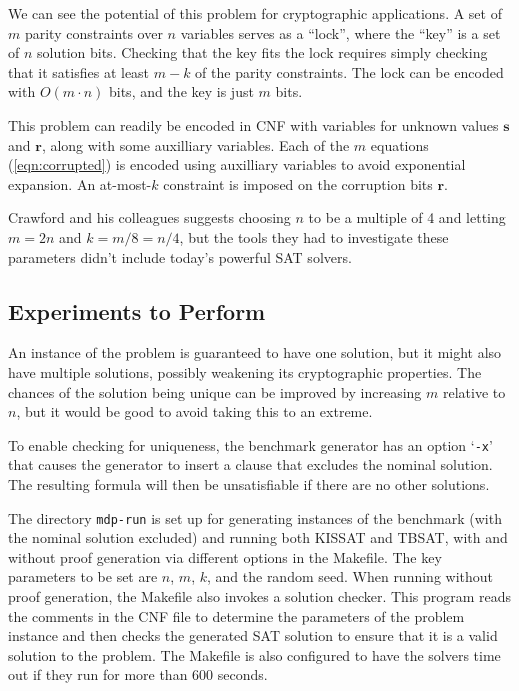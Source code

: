 We can see the potential of this problem for cryptographic
applications.  A set of $m$ parity constraints over $n$ variables serves as a ``lock'',
where the ``key'' is a set of $n$ solution bits. 
Checking that
the key fits the lock requires simply checking that it satisfies at least $m-k$ of the parity constraints.
The lock can be encoded
with $O(m \cdot n)$ bits, and the key is just $m$ bits.

This problem can readily be encoded in CNF with variables for
unknown values $\bm{s}$ and $\bm{r}$, along with some auxilliary
variables.  Each of the $m$ equations
(\ref{eqn:corrupted}) is encoded using auxilliary variables to avoid
exponential expansion.  An at-most-$k$ constraint is imposed on the
corruption bits $\bm{r}$.

Crawford and his colleagues suggests choosing $n$ to be a multiple of
4 and letting $m = 2n$ and $k = m/8 = n/4$, but the tools they had to
investigate these parameters didn't include today's powerful SAT
solvers.


\subsection*{Experiments to Perform}

An instance of the problem is guaranteed to have one solution, but it
might also have multiple solutions, possibly weakening its
cryptographic properties.  The chances of the solution being unique
can be improved by increasing $m$ relative to $n$, but it would be
good to avoid taking this to an extreme.

To enable checking for uniqueness, the benchmark generator has an
option `\texttt{-x}' that causes the generator to insert a clause that
excludes the nominal solution.  The resulting formula will then be
unsatisfiable if there are no other solutions.

The directory \texttt{mdp-run} is set up for generating instances of
the benchmark (with the nominal solution excluded) and running both
KISSAT and TBSAT, with and without proof generation via different
options in the Makefile.  The key parameters to be set are $n$, $m$,
$k$, and the random seed.  When running without proof generation, the
Makefile also invokes a solution checker.  This program reads the
comments in the CNF file to determine the parameters of the problem
instance and then checks the generated SAT solution to ensure that it
is a valid solution to the problem.  The Makefile is also configured
to have the solvers time out if they run for more than 600 seconds.

